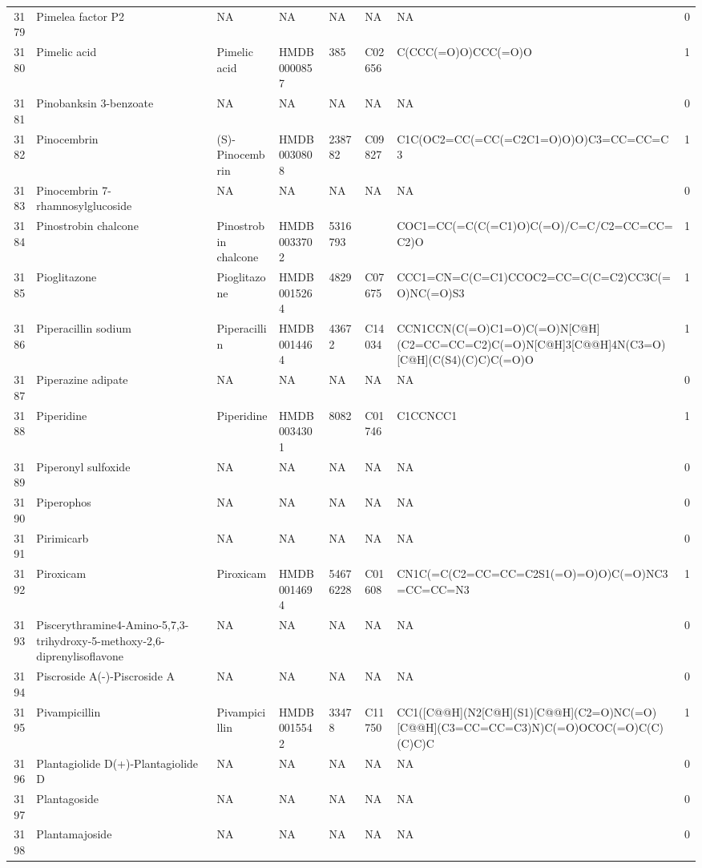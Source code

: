 \documentclass[a4paper]{article}
\begin{document}
\begin{longtable}{rlllllll}
  3179 & Pimelea factor P2 & NA & NA & NA & NA & NA & 0 \\ 
  3180 & Pimelic acid & Pimelic acid & HMDB0000857 & 385 & C02656 & C(CCC(=O)O)CCC(=O)O & 1 \\ 
  3181 & Pinobanksin 3-benzoate & NA & NA & NA & NA & NA & 0 \\ 
  3182 & Pinocembrin & (S)-Pinocembrin & HMDB0030808 & 238782 & C09827 & C1C(OC2=CC(=CC(=C2C1=O)O)O)C3=CC=CC=C3 & 1 \\ 
  3183 & Pinocembrin 7-rhamnosylglucoside & NA & NA & NA & NA & NA & 0 \\ 
  3184 & Pinostrobin chalcone & Pinostrobin chalcone & HMDB0033702 & 5316793 &  & COC1=CC(=C(C(=C1)O)C(=O)/C=C/C2=CC=CC=C2)O & 1 \\ 
  3185 & Pioglitazone & Pioglitazone & HMDB0015264 & 4829 & C07675 & CCC1=CN=C(C=C1)CCOC2=CC=C(C=C2)CC3C(=O)NC(=O)S3 & 1 \\ 
  3186 & Piperacillin sodium & Piperacillin & HMDB0014464 & 43672 & C14034 & CCN1CCN(C(=O)C1=O)C(=O)N[C@H](C2=CC=CC=C2)C(=O)N[C@H]3[C@@H]4N(C3=O)[C@H](C(S4)(C)C)C(=O)O & 1 \\ 
  3187 & Piperazine adipate & NA & NA & NA & NA & NA & 0 \\ 
  3188 & Piperidine & Piperidine & HMDB0034301 & 8082 & C01746 & C1CCNCC1 & 1 \\ 
  3189 & Piperonyl sulfoxide & NA & NA & NA & NA & NA & 0 \\ 
  3190 & Piperophos & NA & NA & NA & NA & NA & 0 \\ 
  3191 & Pirimicarb & NA & NA & NA & NA & NA & 0 \\ 
  3192 & Piroxicam & Piroxicam & HMDB0014694 & 54676228 & C01608 & CN1C(=C(C2=CC=CC=C2S1(=O)=O)O)C(=O)NC3=CC=CC=N3 & 1 \\ 
  3193 & Piscerythramine4-Amino-5,7,3-trihydroxy-5-methoxy-2,6-diprenylisoflavone & NA & NA & NA & NA & NA & 0 \\ 
  3194 & Piscroside A(-)-Piscroside A & NA & NA & NA & NA & NA & 0 \\ 
  3195 & Pivampicillin & Pivampicillin & HMDB0015542 & 33478 & C11750 & CC1([C@@H](N2[C@H](S1)[C@@H](C2=O)NC(=O)[C@@H](C3=CC=CC=C3)N)C(=O)OCOC(=O)C(C)(C)C)C & 1 \\ 
  3196 & Plantagiolide D(+)-Plantagiolide D & NA & NA & NA & NA & NA & 0 \\ 
  3197 & Plantagoside & NA & NA & NA & NA & NA & 0 \\ 
  3198 & Plantamajoside & NA & NA & NA & NA & NA & 0 \\ 

\end{longtable}
\end{document}
